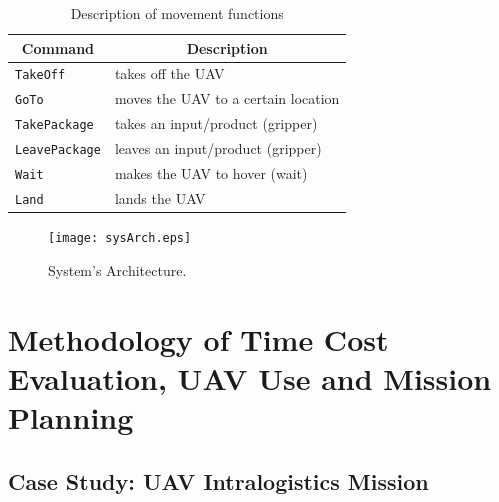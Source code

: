 \documentclass[conference,harvard,brazil,english]{sbatex}
\newcommand{\commentib}[1]{{\color{blue} [IB: #1]}}
\begin{document}
\begin{table}[]
\scriptsize
\centering
\caption{Description of movement functions}
\label{table:movfunc}
\begin{tabular}{|l|l|}
\hline
\multicolumn{1}{|c|}{\textbf{Command}} & \multicolumn{1}{c|}{\textbf{Description}}           \\ \hline
\texttt{TakeOff}                     & takes off the UAV                                   \\ \hline
\texttt{GoTo}                        & moves the UAV to a certain location                 \\ \hline
\texttt{TakePackage}                 & takes an input/product (gripper) \\ \hline
\texttt{LeavePackage}                & leaves an input/product (gripper)   \\ \hline
\texttt{Wait}                        & makes the UAV to hover (wait)                       \\ \hline
\texttt{Land}                        & lands the UAV                                       \\ \hline
\end{tabular}
\end{table}


\begin{figure}[H]
	\centering
	\texttt{[image: sysArch.eps]}
	\caption{System's Architecture.\label{fig:sysArch}}
\end{figure}




\section{Methodology of Time Cost Evaluation, UAV Use and Mission Planning}
\label{sec:method}



\subsection{Case Study: UAV Intralogistics Mission}
\label{sec:ec}
\end{document}
